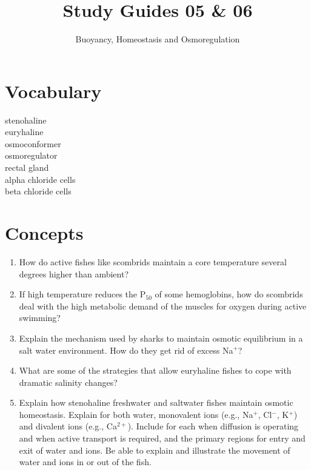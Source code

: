 \documentclass[nofonts, letterpaper]{tufte-handout}
\title{Study Guides 05 \& 06}
\author{Buoyancy, Homeostasis and Osmoregulation}
\date{} %
\begin{document}
\maketitle	%


\section{Vocabulary} 
\vspace{-1\baselineskip}
\begin{multicols}{2}
stenohaline \\
euryhaline \\
osmoconformer \\
osmoregulator \\
rectal gland \\
alpha chloride cells \\
beta chloride cells
\end{multicols}

\section{Concepts}

\begin{enumerate}
	\item How do active fishes like scombrids maintain a core temperature several degrees higher than ambient?

	\item If high temperature reduces the P$_{50}$ of some hemoglobins, how do scombrids deal with the high metabolic demand of the muscles for oxygen during active swimming?

	\item Explain the mechanism used by sharks to maintain osmotic equilibrium in a salt water environment. How do they get rid of excess Na$^+$?

	\item What are some of the strategies that allow euryhaline fishes to cope with dramatic salinity changes?
	
	\item Explain how stenohaline freshwater and saltwater fishes maintain osmotic homeostasis.  Explain for both water, monovalent ions (e.g., Na$^+$, Cl$^-$, K$^+$) and divalent ions (e.g., Ca$^{2+}$).  Include for each when diffusion is operating and when active transport is required, and the primary regions for entry and exit of water and ions.  Be able to explain and illustrate the movement of water and ions in or out of the fish.
\end{enumerate}
\end{document}
